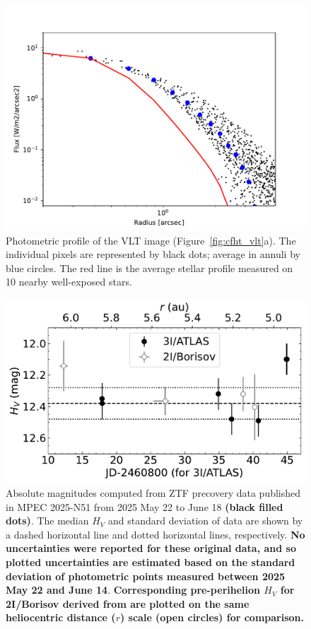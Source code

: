 \documentclass[linenumbers,twocolumn,longbib]{aastex7}
\begin{document}
\begin{figure}
    \includegraphics[width=1.\linewidth]{static/3I_profile.pdf}
\caption{Photometric profile of the VLT image (Figure~\ref{fig:cfht_vlt}a). The individual pixels are represented by black dots; average in annuli by blue circles. The red line is the average stellar profile measured on 10 nearby well-exposed stars.
}
\label{fig:vlt_profile}
\end{figure}

\begin{figure}
    \includegraphics[width=1.\linewidth]{static/fig_ztf_secular_lc_3I_borisov.pdf}
    \caption{Absolute magnitudes computed from ZTF precovery data published in MPEC 2025-N51 from 2025 May 22 to June 18 {\bf (black filled dots)}.  The median $H_V$ and standard deviation of data  are shown by a dashed horizontal line and dotted horizontal lines, respectively. {\bf No uncertainties were reported for these original data, and so plotted uncertainties are estimated based on the standard deviation of photometric points measured between 2025 May 22 and June 14}.  {\bf Corresponding pre-perihelion $H_V$ for 2I/Borisov derived from \citet{ye2020_borisov} are plotted on the same heliocentric distance ($r$) scale (open circles) for comparison.}}
\label{fig:ztf_secular}
\end{figure}
\end{document}
